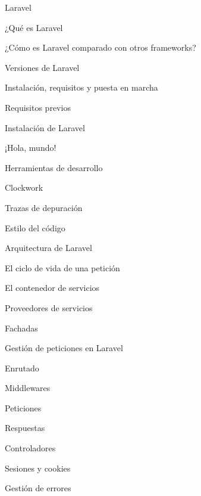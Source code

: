 \begin{longenum}
\begin{longenum}
        \item Laravel
        \begin{longenum}
            \item ¿Qué es Laravel
            \item ¿Cómo es Laravel comparado con otros frameworks?
            \item Versiones de Laravel
        \end{longenum}
        \item Instalación, requisitos y puesta en marcha
        \begin{longenum}
            \item Requisitos previos
            \item Instalación de Laravel
        \end{longenum}
        \item ¡Hola, mundo!
        \item Herramientas de desarrollo
        \begin{longenum}
            \item Clockwork
            \item Trazas de depuración
        \end{longenum}
        \item Estilo del código
        \item Arquitectura de Laravel
        \begin{longenum}
            \item El ciclo de vida de una petición
            \item El contenedor de servicios
            \item Proveedores de servicios
            \item Fachadas
        \end{longenum}
        \item Gestión de peticiones en Laravel
        \begin{longenum}
            \item Enrutado
            \item Middlewares
            \item Peticiones
            \item Respuestas
            \item Controladores
            \item Sesiones y cookies
            \item Gestión de errores
        \end{longenum}
    \end{longenum}

\end{longenum}
